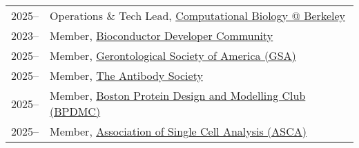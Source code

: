 \begin{longtable}[l]{@{}p{} p{}}

    2025-- & Operations \& Tech Lead, \href{https://compbioatberkeley.com}{Computational Biology @ Berkeley} \\

    2023-- & Member, \href{https://www.bioconductor.org/developers/}{Bioconductor Developer Community} \\
    
    2025-- & Member, \href{https://www.geron.org}{Gerontological Society of America (GSA)} \\

    2025-- & Member, \href{https://www.antibodysociety.org/}{The Antibody Society} \\

    2025-- & Member, \href{https://www.bpdmc.org/}{Boston Protein Design and Modelling Club (BPDMC)} \\

    2025-- & Member, \href{https://ascanet.org/}{Association of Single Cell Analysis (ASCA)} \\


\end{longtable}
